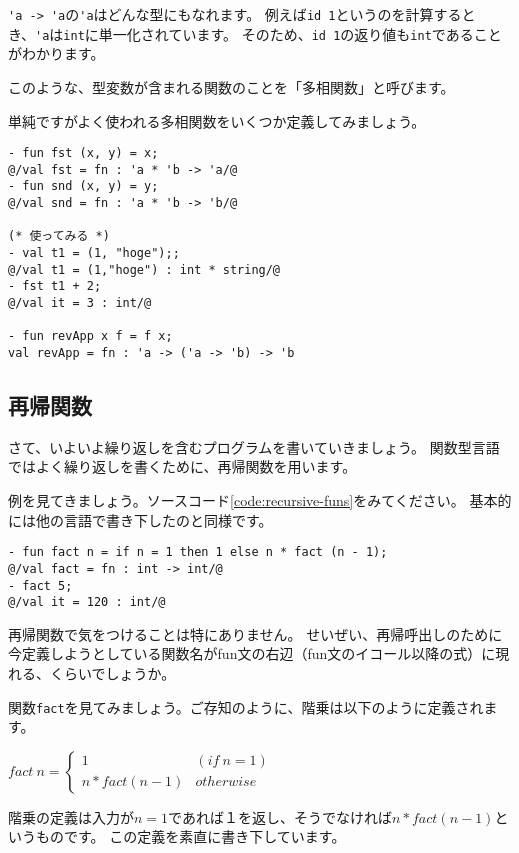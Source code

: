 \documentclass[11pt,a4paper]{article}
\begin{document}
\lstinline{'a -> 'a}の\lstinline{'a}はどんな型にもなれます。
例えば\lstinline{id 1}というのを計算するとき、\lstinline{'a}は\lstinline{int}に単一化されています。
そのため、\lstinline{id 1}の返り値も\lstinline{int}であることがわかります。

このような、型変数が含まれる関数のことを「多相関数」と呼びます。

単純ですがよく使われる多相関数をいくつか定義してみましょう。

\begin{lstlisting}[caption=多相関数たち,label=code:poly]
- fun fst (x, y) = x;
@/val fst = fn : 'a * 'b -> 'a/@
- fun snd (x, y) = y;
@/val snd = fn : 'a * 'b -> 'b/@

(* 使ってみる *)
- val t1 = (1, "hoge");;
@/val t1 = (1,"hoge") : int * string/@
- fst t1 + 2;
@/val it = 3 : int/@

- fun revApp x f = f x;
val revApp = fn : 'a -> ('a -> 'b) -> 'b
\end{lstlisting}


\subsection{再帰関数}

さて、いよいよ繰り返しを含むプログラムを書いていきましょう。
関数型言語ではよく繰り返しを書くために、再帰関数を用います。

例を見てきましょう。ソースコード\ref{code:recursive-funs}をみてください。
基本的には他の言語で書き下したのと同様です。


\begin{lstlisting}[caption=再帰関数,label=code:recursive-funs]
- fun fact n = if n = 1 then 1 else n * fact (n - 1);
@/val fact = fn : int -> int/@
- fact 5;
@/val it = 120 : int/@
\end{lstlisting}


再帰関数で気をつけることは特にありません。
せいぜい、再帰呼出しのために今定義しようとしている関数名がfun文の右辺（fun文のイコール以降の式）に現れる、くらいでしょうか。

関数\lstinline{fact}を見てみましょう。ご存知のように、階乗は以下のように定義されます。

$fact \ n = \begin{cases} 1 & (if \ n = 1) \\ n * fact (n - 1) & otherwise \end{cases}$

階乗の定義は入力が$n=1$であれば１を返し、そうでなければ$n * fact (n - 1)$というものです。
この定義を素直に書き下しています。
\end{document}
